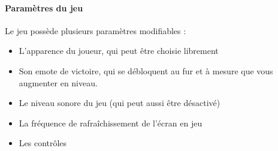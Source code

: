 \paragraph{Paramètres du jeu}

    Le jeu possède plusieurs paramètres modifiables : 
    \begin{itemize}
        \item L'apparence du joueur, qui peut être choisie librement
        \item Son emote de victoire, qui se débloquent au fur et à mesure que vous augmenter en niveau.
        \item Le niveau sonore du jeu (qui peut aussi être désactivé)
        \item La fréquence de rafraîchissement de l'écran en jeu
        \item Les contrôles
    \end{itemize}